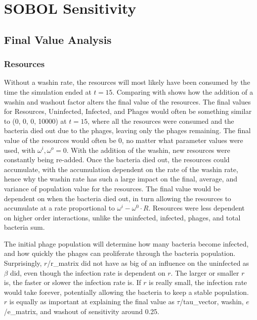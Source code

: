 \section{SOBOL Sensitivity}
\subsection{Final Value Analysis}
\subsubsection{Resources}
Without a washin rate, the resources will most likely have been consumed by the time the simulation ended at $t=15$. 
Comparing  with  shows how the addition of a washin and washout factor alters the final value of the resources. 
The final values for Resources, Uninfected, Infected, and Phages would often be something similar to (0, 0, 0, 10000) at $t=15$, where all the resources were consumed and the bacteria died out due to the phages, leaving only the phages remaining. 
The final value of the resources would often be 0, no matter what parameter values were used, with $\omega^i, \omega^o = 0$. 
With the addition of the washin, new resources were constantly being re-added. 
Once the bacteria died out, the resources could accumulate, with the accumulation dependent on the rate of the washin rate, hence why the washin rate has such a large impact on the final, average, and variance of population value for the resources. 
The final value would be dependent on when the bacteria died out, in turn allowing the resources to accumulate at a rate proportional to $\omega^i - \omega^0\cdot R$. 
Resources were less dependent on higher order interactions, unlike the uninfected, infected, phages, and total bacteria sum. 

The initial phage population will determine how many bacteria become infected, and how quickly the phages can proliferate through the bacteria population. 
Surprisingly, $r$/r\_matrix did not have as big of an influence on the uninfected as $\beta$ did, even though the infection rate is dependent on $r$. 
The larger or smaller $r$ is, the faster or slower the infection rate is. If $r$ is really small, the infection rate would take forever, potentially allowing the bacteria to keep a stable population. 
$r$ is equally as important at explaining the final value as $\tau$/tau\_vector, washin, $e$/e\_matrix, and washout of sensitivity around 0.25. 
